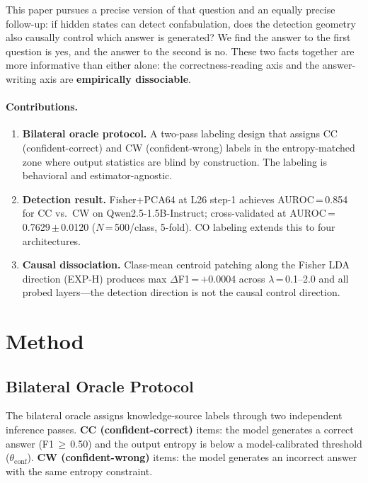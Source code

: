 \documentclass[11pt,twocolumn]{article}
\begin{document}
This paper pursues a precise version of that question and an equally precise follow-up:
if hidden states can detect confabulation, does the detection geometry also causally
control which answer is generated? We find the answer to the first question is yes,
and the answer to the second is no. These two facts together are more informative than
either alone: the correctness-reading axis and the answer-writing axis are
\textbf{empirically dissociable}.

\paragraph{Contributions.}
\begin{enumerate}[leftmargin=2em, topsep=2pt, itemsep=1pt]
  \item \textbf{Bilateral oracle protocol.} A two-pass labeling design that assigns
    CC (confident-correct) and CW (confident-wrong) labels in the entropy-matched zone
    where output statistics are blind by construction. The labeling is behavioral and
    estimator-agnostic.
  \item \textbf{Detection result.} Fisher+PCA64 at L26 step-1 achieves
    AUROC\,=\,0.854 for CC vs.\ CW on Qwen2.5-1.5B-Instruct; cross-validated at
    AUROC\,=\,0.7629\,$\pm$\,0.0120 ($N$\,=\,500/class, 5-fold). CO labeling extends
    this to four architectures.
  \item \textbf{Causal dissociation.} Class-mean centroid patching along the
    Fisher LDA direction (EXP-H) produces max $\Delta$F1\,=\,$+$0.0004 across
    $\lambda$\,=\,0.1--2.0 and all probed layers---the detection direction is not the
    causal control direction.
\end{enumerate}

\section{Method}

\subsection{Bilateral Oracle Protocol}

The bilateral oracle assigns knowledge-source labels through two independent inference
passes. \textbf{CC (confident-correct)} items: the model generates a correct answer
(F1\,$\geq$\,0.50) and the output entropy is below a model-calibrated threshold
($\theta_\text{conf}$). \textbf{CW (confident-wrong)} items: the model generates an
incorrect answer with the same entropy constraint.
\end{document}
